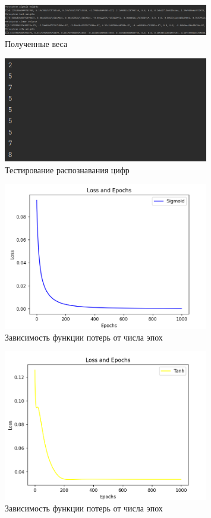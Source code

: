 \documentclass[a4paper, 14pt]{extarticle}
\begin{document}
\begin{figure}[!htb]
	\centering
	\includegraphics[width=0.8\textwidth]{img1}
\caption{Полученные веса}
\label{fig:img1}
\end{figure}

\begin{figure}[!htb]
	\centering
	\includegraphics[width=0.8\textwidth]{img2}
\caption{Тестирование распознавания цифр}
\label{fig:img2}
\end{figure}

\begin{figure}[!htb]
	\centering
	\includegraphics[width=0.8\textwidth]{img3}
\caption{Зависимость функции потерь от числа эпох}
\label{fig:img3}
\end{figure}

\begin{figure}[!htb]
	\centering
	\includegraphics[width=0.8\textwidth]{img4}
\caption{Зависимость функции потерь от числа эпох}
\label{fig:img4}
\end{figure}
\end{document}
